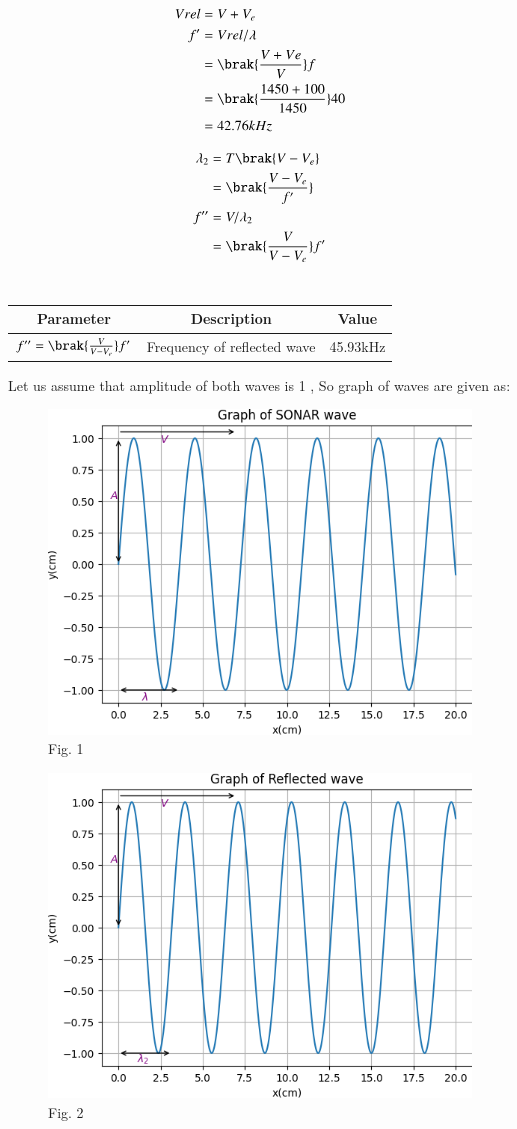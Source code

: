 \documentclass[journal,12pt,onecolumn]{IEEEtran}
\theoremstyle{remark}
\begin{document}
\begin{align}
Vrel&=V+V_e\\
f'&=Vrel/\lambda\\
&=\brak{\frac{V+Ve}{V}}f\\
&= \brak{\frac{1450+100}{1450}}40\\
&=42.76kHz
\end{align}

\begin{align}
\lambda_2&=T\brak{V-V_e}\\
&=\brak{\frac{V-V_e}{f'}}\\
f''&=V/\lambda_2\\
&=\brak{\frac{V}{V-V_e}}f'
\end{align}
\\
\begin{tabular}{|c|c|c|}
   \hline
   Parameter & Description & Value\\
   \hline
   $f''= \brak{\frac{V}{V-V_e}}f'$& Frequency of reflected wave & 45.93kHz\\
   \hline
   
\end{tabular}
\newpage
Let us assume that amplitude of both waves is 1 , So graph of waves are given as: 

\begin{figure}[h]
   
    \includegraphics[width=120mm]{figs/fig1.png}\\
     \centering
    {Fig. 1}
  
\end{figure}

\begin{figure}[h]
    
    \includegraphics[width=120mm]{figs/fig2.png}\\
     \centering
    {Fig. 2}
\end{figure}
\end{document}
